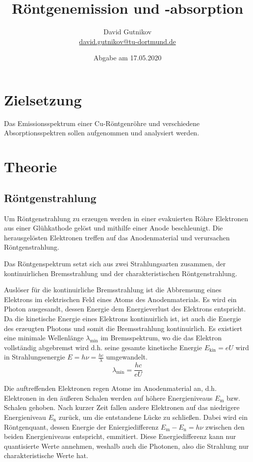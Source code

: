 \documentclass[titlepage = firstcover]{scrartcl}
\title{Röntgenemission und -absorption}
\author{David Gutnikov \\
        \href{mailto:david.gutnikov@tu-dortmund.de}{david.gutnikov@tu-dortmund.de}}
\date{Abgabe am 17.05.2020}
\begin{document}
    \maketitle
    \newpage
    \tableofcontents
    \newpage

    \section{Zielsetzung}
      Das Emissionsspektrum einer Cu-Röntgenröhre und verschiedene Absorptionsspektren sollen aufgenommen und analysiert werden.

    \section{Theorie}

      \subsection{Röntgenstrahlung}
        Um Röntgenstrahlung zu erzeugen werden in einer evakuierten Röhre Elektronen aus einer Glühkathode gelöst und mithilfe einer Anode beschleunigt. Die herausgelösten Elektronen treffen auf das Anodenmaterial und verursachen Röntgenstrahlung.

        Das Röntgenspektrum setzt sich aus zwei Strahlungsarten zusammen, der kontinuirlichen Bremsstrahlung und der charakteristischen Röntgenstrahlung.

        Auslöser für die kontinuirliche Bremsstrahlung ist die Abbremsung eines Elektrons im elektrischen Feld eines Atoms des Anodenmaterials. Es wird ein Photon ausgesandt, dessen Energie dem Energieverlust des Elektrons entspricht. Da die kinetische Energie eines Elektrons kontinuirlich ist, ist auch die Energie des erzeugten Photons und somit die Bremsstrahlung kontinuirlich. Es existiert eine minimale Wellenlänge $\lambda_\text{min}$ im Bremsspektrum, wo die das Elektron vollständig abgebremst wird d.h. seine gesamte kinetische Energie $E_\text{kin} = e U$ wird in Strahlungsenergie $E = h \nu = \frac{h c}{\lambda}$ umgewandelt.
        \begin{equation}
            \lambda_\text{min} = \frac{h c}{e U}
        \end{equation}

        Die auftreffenden Elektronen regen Atome im Anodenmaterial an, d.h. Elektronen in den äußeren Schalen werden auf höhere Energieniveaus $E_\text{m}$ bzw. Schalen gehoben. Nach kurzer Zeit fallen andere Elektronen auf das niedrigere Energieniveau $E_\text{n}$ zurück, um die entstandene Lücke zu schließen. Dabei wird ein Röntgenquant, dessen Energie der Eniergiedifferenz $E_\text{m} - E_\text{n} = h \nu$ zwischen den beiden Energieniveaus entspricht, emmitiert. Diese Energiedifferenz kann nur quantisierte Werte annehmen, weshalb auch die Photonen, also die Strahlung nur charakteristische Werte hat.
\end{document}
